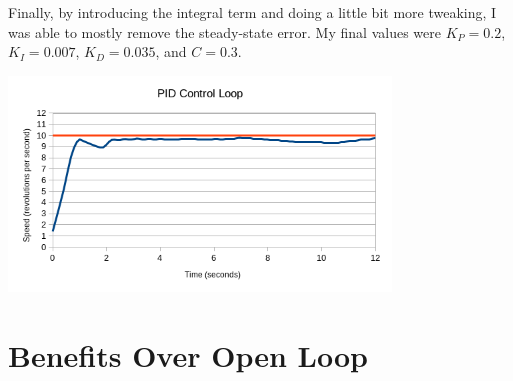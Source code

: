 \documentclass{article}
\begin{document}
Finally, by introducing the integral term and doing a little bit more tweaking, I was able to mostly remove the steady-state error. My final values were $K_P = 0.2$, $K_I = 0.007$, $K_D = 0.035$, and $C = 0.3$.
\begin{center}
  \includegraphics[width=4in]{pid_loop.png}
\end{center}



\section*{Benefits Over Open Loop}
\end{document}
